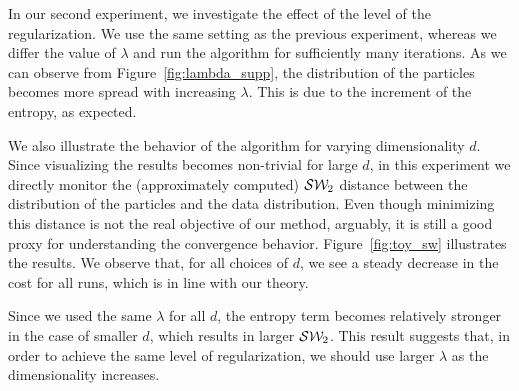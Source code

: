 In our second experiment, we investigate the effect of the level of the regularization. We use the same setting as the previous experiment, whereas we differ the value of $\lambda$ and run the algorithm for sufficiently many iterations. As we can observe from Figure~\ref{fig:lambda_supp}, the distribution of the particles becomes more spread with increasing $\lambda$. This is due to the increment of the entropy, as expected.



We also illustrate the behavior of the algorithm for varying dimensionality $d$. Since visualizing the results becomes non-trivial for large $d$, in this experiment we directly monitor the (approximately computed) ${\cal S}{\cal W}_2$ distance between the distribution of the particles and the data distribution. Even though minimizing this distance is not the real objective of our method, arguably, it is still a good proxy for understanding the convergence behavior. 
%
Figure~\ref{fig:toy_sw} illustrates the results. We observe that, for all choices of $d$, we see a steady decrease in the cost for all runs, which is in line with our theory. 


Since we used the same $\lambda$ for all $d$, the entropy term becomes relatively stronger in the case of smaller $d$, which results in larger ${\cal S}{\cal W}_2$. This result suggests that, in order to achieve the same level of regularization, we should use larger $\lambda$ as the dimensionality increases. 












